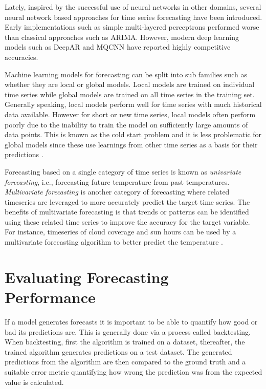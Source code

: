 Lately, inspired by the successful use of neural networks in other domains, several neural network based approaches for time series forecasting have been introduced. Early implementations such as simple multi-layered perceptrons performed worse than classical approaches such as ARIMA. However, modern deep learning models such as DeepAR \cite{salinas_deepar_2019} and MQCNN \cite{wen_multi-horizon_2018} have reported highly competitive accuracies.

Machine learning models for forecasting can be split into sub families such as whether they are local or global models. Local models are trained on individual time series while global models are trained on all time series in the training set. Generally speaking, local models perform well for time series with much historical data available. However for short or new time series, local models often perform poorly due to the inability to train the model on sufficiently large amounts of data points. This is known as the cold start problem and it is less problematic for global models since these use learnings from other time series as a basis for their predictions \cite{wang_deep_2019}.

Forecasting based on a single category of time series is known as \textit{univariate forecasting}, i.e., forecasting future temperature from past temperatures. \textit{Multivariate forecasting} is another category of forecasting where related timeseries are leveraged to more accurately predict the target time series. The benefits of multivariate forecasting is that trends or patterns can be identified using these related time series to improve the accuracy for the target variable. For instance, timeseries of cloud coverage and sun hours can be used by a multivariate forecasting algorithm to better predict the temperature \cite{wang_deep_2019}.

\section{Evaluating Forecasting Performance}
\label{sec:evaluating_performance}
If a model generates forecasts it is important to be able to quantify how good or bad its predictions are. This is generally done via a process called backtesting. When backtesting, first the algorithm is trained on a dataset, thereafter, the trained algorithm generates predictions on a test dataset. The generated predictions from the algorithm are then compared to the ground truth and a suitable error metric quantifying how wrong the prediction was from the expected value is calculated.

